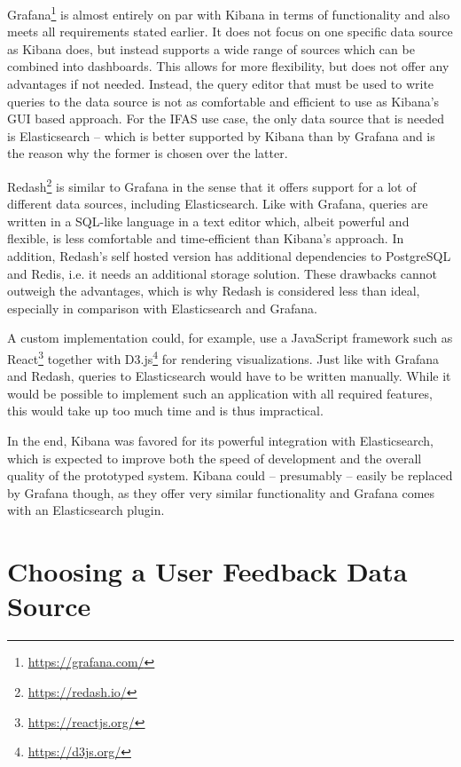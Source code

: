 Grafana\footnote{\url{https://grafana.com/}} is almost entirely on par with Kibana in terms of functionality and also meets all requirements stated earlier.
It does not focus on one specific data source as Kibana does, but instead supports a wide range of sources which can be combined into dashboards.
This allows for more flexibility, but does not offer any advantages if not needed.
Instead, the query editor that must be used to write queries to the data source is not as comfortable and efficient to use as Kibana's GUI based approach.
For the \ac{IFAS} use case, the only data source that is needed is Elasticsearch -- which is better supported by Kibana than by Grafana and is the reason why the former is chosen over the latter.

Redash\footnote{\url{https://redash.io/}} is similar to Grafana in the sense that it offers support for a lot of different data sources, including Elasticsearch.
Like with Grafana, queries are written in a \ac{SQL}-like language in a text editor which, albeit powerful and flexible, is less comfortable and time-efficient than Kibana's approach.
In addition, Redash's self hosted version has additional dependencies to PostgreSQL and Redis, i.e. it needs an additional storage solution.
These drawbacks cannot outweigh the advantages, which is why Redash is considered less than ideal, especially in comparison with Elasticsearch and Grafana.

A custom implementation could, for example, use a JavaScript framework such as React\footnote{\url{https://reactjs.org/}} together with D3.js\footnote{\url{https://d3js.org/}} for rendering visualizations.
Just like with Grafana and Redash, queries to Elasticsearch would have to be written manually.
While it would be possible to implement such an application with all required features, this would take up too much time and is thus impractical.

In the end, Kibana was favored for its powerful integration with Elasticsearch, which is expected to improve both the speed of development and the overall quality of the prototyped system.
Kibana could -- presumably -- easily be replaced by Grafana though, as they offer very similar functionality and Grafana comes with an Elasticsearch plugin.

\section{Choosing a User Feedback Data Source}
\label{sec:design:data-source}

